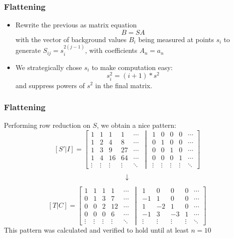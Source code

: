 \documentclass{beamer}
\begin{document}
\begin{frame}
	\frametitle{Flattening}
	\begin{itemize}
		\item<1-> Rewrite the previous as matrix equation
			\[B = SA\]
			with the vector of background values \(B_i\) being measured at points \(s_i\) to generate \(S_{ij} = s_i^{2(j-1)}\), with coefficients \(A_n = a_n\) 
		\item<2-> We strategically chose \(s_i\) to make computation easy:
			\[s_i^2 = (i+1)*s^2\]
			and suppress powers of \(s^2\) in the final matrix.
	\end{itemize}
\end{frame}

\begin{frame}
	\frametitle{Flattening}
	Performing row reduction on \(S\), we obtain a nice pattern:
	\[ [S'|I] = \left[ \begin{matrix} 1 & 1 & 1 & 1 & \cdots \\
			1 & 2 & 4 & 8 & \cdots \\
			1 & 3 & 9 & 27 & \cdots \\
			1 & 4 & 16 & 64 & \cdots\\
			\vdots & \vdots & \vdots & \vdots & \ddots
	\end{matrix} \,\middle\vert\, \begin{matrix}
			1 & 0 & 0 & 0 & \cdots \\
			0 & 1 & 0 & 0 & \cdots \\
			0 & 0 & 1 & 0 & \cdots \\
			0 & 0 & 0 & 1 & \cdots\\
			\vdots & \vdots & \vdots & \vdots & \ddots
	\end{matrix} \right]\]
	\[\downarrow\]
	\[ [T|C] = \left[ \begin{matrix}
			1 & 1 & 1 & 1 & \cdots\\
			0 & 1 & 3 & 7 & \cdots\\
			0 & 0 & 2 & 12 & \cdots\\
			0 & 0 & 0 & 6 & \cdots \\
			\vdots & \vdots & \vdots & \vdots & \ddots
	\end{matrix} \,\middle\vert\, \begin{matrix}
			1 & 0 & 0 & 0 &\cdots \\
			-1 & 1 & 0 & 0 &\cdots \\
			1 & -2 & 1 & 0 &\cdots \\
			-1 & 3 & -3 & 1 &\cdots \\
			\vdots & \vdots & \vdots & \vdots & \ddots
	\end{matrix} \right]\]
	This pattern was calculated and verified to hold until at least \(n=10\)
\end{frame}
\end{document}

